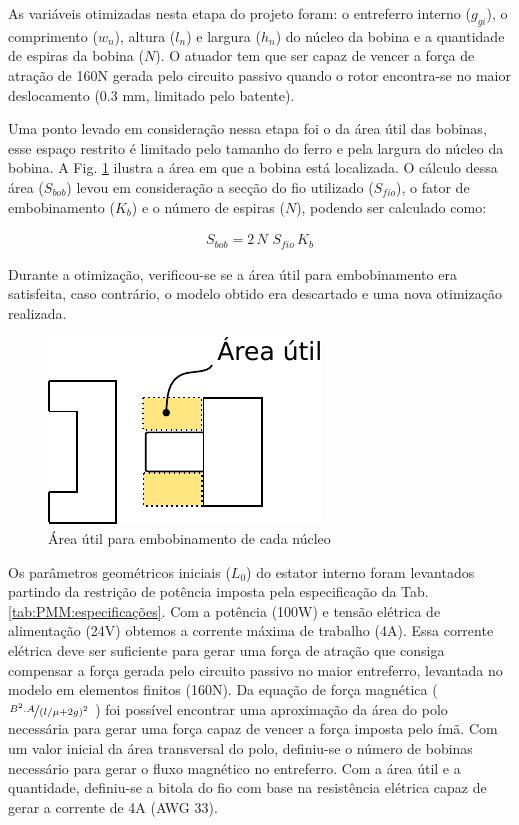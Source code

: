 As variáveis otimizadas nesta etapa do projeto foram:  o entreferro interno ($g_{gi}$), o comprimento ($w_n$), altura ($l_n$) e largura ($h_n$)  do núcleo da bobina e a quantidade de espiras da bobina ($N$). O atuador tem que ser capaz de vencer a força de atração de 160N gerada pelo circuito passivo quando o rotor encontra-se no maior deslocamento (0.3 mm, limitado pelo batente). 

Uma ponto levado em consideração nessa etapa foi o da área útil das bobinas, esse espaço restrito é limitado pelo tamanho do ferro e pela largura do núcleo da bobina. A Fig. \ref{fig:modelo_ativo_bobina} ilustra a área em que a bobina está localizada. O cálculo dessa área ($S_{bob}$) levou em consideração a secção do fio utilizado ($S_{fio}$), o fator de embobinamento ($K_b$) e o número de espiras ($N$), podendo ser calculado como: 

\begin{align}
	S_{bob} = 2 \, N \, \, S_{fio} \, K_b
\end{align}

Durante a otimização, verificou-se se a área útil para embobinamento era satisfeita, caso contrário, o modelo obtido era descartado e uma nova otimização realizada.

\begin{figure}[ht!]
\centering
\includegraphics[width=0.7\linewidth]{Figs/modelo_ativo_bobina}
\caption{Área útil para embobinamento de cada núcleo}
\label{fig:modelo_ativo_bobina}
\end{figure}

Os parâmetros geométricos iniciais ($L_0$) do estator interno foram levantados partindo da restrição de potência imposta pela especificação da Tab. \ref{tab:PMM:especificações}. Com a potência (100W) e tensão elétrica de alimentação (24V) obtemos a corrente máxima de trabalho (4A). Essa corrente elétrica deve ser suficiente para gerar uma força de atração que consiga compensar a força gerada pelo circuito passivo no maior entreferro, levantada no modelo em elementos finitos (160N). Da equação de força magnética ($\nicefrac{B^2.A}{(l/\mu +2g)^2}$ ) foi possível encontrar uma aproximação da área do polo necessária para gerar uma força capaz de vencer a força imposta pelo ímã. Com um valor inicial da área transversal do polo, definiu-se o número de  bobinas necessário para gerar o fluxo magnético no entreferro. Com a área útil e a quantidade, definiu-se a bitola do fio com base na resistência elétrica capaz de gerar a corrente de 4A (AWG 33).


